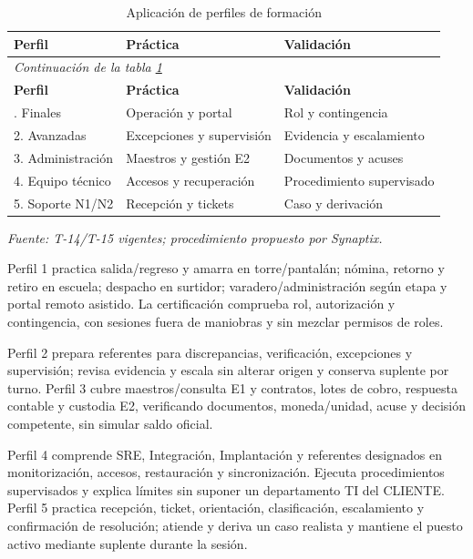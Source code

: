 \begingroup\small\setlength{\tabcolsep}{3pt}
\begin{longtable}{p{}p{}p{}}
\caption{Aplicación de perfiles de formación}\label{tab:t18-formacion}\\\hline
\textbf{Perfil} & \textbf{Práctica} & \textbf{Validación}\\\hline\endfirsthead
\multicolumn{3}{l}{\textit{Continuación de la tabla \ref{tab:t18-formacion}}}\\\hline
\textbf{Perfil} & \textbf{Práctica} & \textbf{Validación}\\\hline\endhead
\hline\endfoot\hline\endlastfoot
1. Finales & Operación y portal & Rol y contingencia\\\hline
2. Avanzadas & Excepciones y supervisión & Evidencia y escalamiento\\\hline
3. Administración & Maestros y gestión E2 & Documentos y acuses\\\hline
4. Equipo técnico & Accesos y recuperación & Procedimiento supervisado\\\hline
5. Soporte N1/N2 & Recepción y tickets & Caso y derivación\\\hline
\end{longtable}\endgroup
\noindent\textit{Fuente: T-14/T-15 vigentes; procedimiento propuesto por Synaptix.}

Perfil 1 practica salida/regreso y amarra en torre/pantalán; nómina, retorno y retiro en escuela; despacho en surtidor; varadero/administración según etapa y portal remoto asistido. La certificación comprueba rol, autorización y contingencia, con sesiones fuera de maniobras y sin mezclar permisos de roles.

Perfil 2 prepara referentes para discrepancias, verificación, excepciones y supervisión; revisa evidencia y escala sin alterar origen y conserva suplente por turno. Perfil 3 cubre maestros/consulta E1 y contratos, lotes de cobro, respuesta contable y custodia E2, verificando documentos, moneda/unidad, acuse y decisión competente, sin simular saldo oficial.

Perfil 4 comprende SRE, Integración, Implantación y referentes designados en monitorización, accesos, restauración y sincronización. Ejecuta procedimientos supervisados y explica límites sin suponer un departamento TI del CLIENTE. Perfil 5 practica recepción, ticket, orientación, clasificación, escalamiento y confirmación de resolución; atiende y deriva un caso realista y mantiene el puesto activo mediante suplente durante la sesión.


